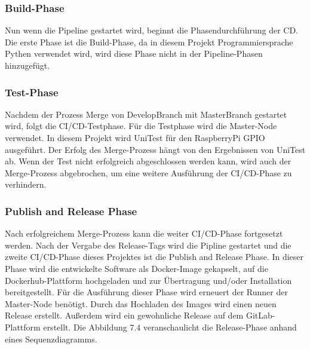 \subsubsection*{Build-Phase}

Nun wenn die Pipeline gestartet wird, beginnt die Phasendurchführung der CD. Die erste Phase ist die Build-Phase, da in diesem Projekt Programmiersprache Pythen verwendet wird, wird diese Phase nicht in der Pipeline-Phasen hinzugefügt.

\subsubsection*{Test-Phase}

Nachdem der Prozess Merge von DevelopBranch mit  MasterBranch gestartet wird, folgt die \ac{CI/CD}-Testphase. Für die Testphase wird die Master-Node verwendet. In diesem Projekt wird UniTest für den RaspberryPi GPIO ausgeführt. Der Erfolg des Merge-Prozess hängt von den Ergebnissen von UniTest ab. Wenn der Test nicht erfolgreich abgeschlossen werden kann, wird auch der Merge-Prozess abgebrochen, um eine weitere Ausführung der \ac{CI/CD}-Phase zu verhindern.

\subsubsection*{Publish and Release Phase}

Nach erfolgreichem Merge-Prozess kann die weiter \ac{CI/CD}-Phase fortgesetzt werden. Nach der Vergabe des Release-Tags wird die Pipline gestartet und die zweite \ac{CI/CD}-Phase dieses Projektes ist die \glqq Publish and Release Phase\grqq. In dieser Phase wird die entwickelte Software als Docker-Image gekapselt, auf die Dockerhub-Plattform hochgeladen und zur Übertragung und/oder Installation bereitgestellt. Für die Ausführung dieser Phase wird erneuert der Runner der Master-Node benötigt. Durch das Hochladen des Images wird einen neuen Release erstellt. Außerdem wird ein gewohnliche Release auf dem GitLab-Plattform erstellt. Die Abbildung 7.4 veranschaulicht die Release-Phase anhand eines Sequenzdiagramms.
